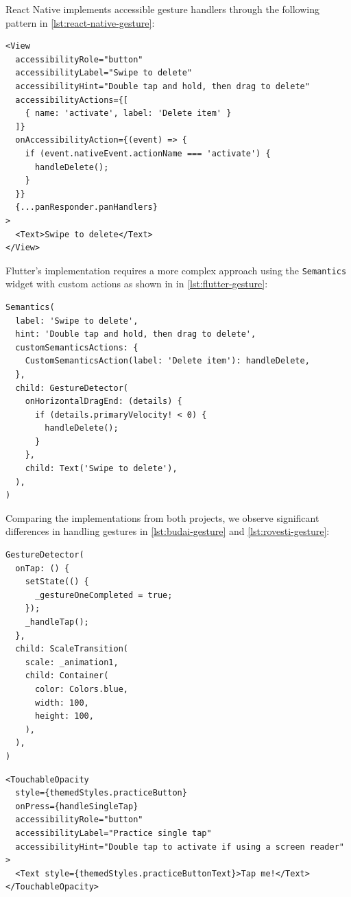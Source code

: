 React Native implements accessible gesture handlers through the following pattern in \ref{lst:react-native-gesture}:

\begin{lstlisting}[style=ReactNativeStyle, caption=Accessible gesture handler in React Native, label=lst:react-native-gesture]
<View
  accessibilityRole="button"
  accessibilityLabel="Swipe to delete"
  accessibilityHint="Double tap and hold, then drag to delete"
  accessibilityActions={[
    { name: 'activate', label: 'Delete item' }
  ]}
  onAccessibilityAction={(event) => {
    if (event.nativeEvent.actionName === 'activate') {
      handleDelete();
    }
  }}
  {...panResponder.panHandlers}
>
  <Text>Swipe to delete</Text>
</View>
\end{lstlisting}

\pagebreak

Flutter's implementation requires a more complex approach using the \texttt{Semantics} widget with custom actions as shown in in \ref{lst:flutter-gesture}:

\begin{lstlisting}[style=DartStyle, caption=Accessible gesture handler in Flutter, label=lst:flutter-gesture]
Semantics(
  label: 'Swipe to delete',
  hint: 'Double tap and hold, then drag to delete',
  customSemanticsActions: {
    CustomSemanticsAction(label: 'Delete item'): handleDelete,
  },
  child: GestureDetector(
    onHorizontalDragEnd: (details) {
      if (details.primaryVelocity! < 0) {
        handleDelete();
      }
    },
    child: Text('Swipe to delete'),
  ),
)
\end{lstlisting}

\pagebreak

Comparing the implementations from both projects, we observe significant differences in handling gestures in \ref{lst:budai-gesture} and \ref{lst:rovesti-gesture}:

\begin{lstlisting}[style=DartStyle, caption=Gesture handling in Budai's Flutter implementation, label=lst:budai-gesture]
GestureDetector(
  onTap: () {
    setState(() {
      _gestureOneCompleted = true;
    });
    _handleTap();
  },
  child: ScaleTransition(
    scale: _animation1,
    child: Container(
      color: Colors.blue,
      width: 100,
      height: 100,
    ),
  ),
)
\end{lstlisting}

\begin{lstlisting}[style=ReactNativeStyle, caption=Gesture handling in AccessibleHub's React Native implementation, label=lst:rovesti-gesture]
<TouchableOpacity
  style={themedStyles.practiceButton}
  onPress={handleSingleTap}
  accessibilityRole="button"
  accessibilityLabel="Practice single tap"
  accessibilityHint="Double tap to activate if using a screen reader"
>
  <Text style={themedStyles.practiceButtonText}>Tap me!</Text>
</TouchableOpacity>
\end{lstlisting}

